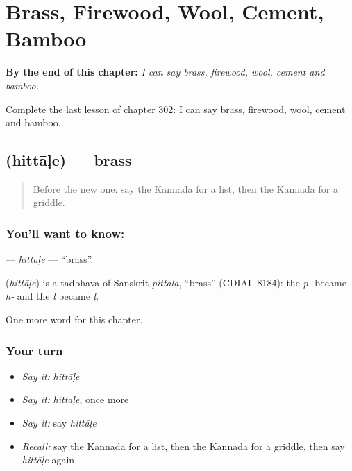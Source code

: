 
\chapter{Brass, Firewood, Wool, Cement, Bamboo}
\label{ch:ka-brass-firewood-wool-cement-bamboo}

\begin{chapteropening}
\textbf{By the end of this chapter:} \emph{I can say brass, firewood, wool, cement and bamboo.}

Complete the last lesson of chapter 302: I can say brass, firewood, wool, cement and bamboo.
\end{chapteropening}

\section[\texorpdfstring{\kn{ಹಿತ್ತಾಳೆ} (hittāḷe)}{ಹಿತ್ತಾಳೆ (hittāḷe)}]{ (hittāḷe) — brass}

\label{lesson:KA-C302-hittale}



\begin{quote}
Before the new one: say the Kannada for a list, then the Kannada for a griddle.
\end{quote}

\subsection*{You'll want to know: }
\textbf{} — \emph{hittāḷe} — \textquotedblleft{}brass\textquotedblright{}.

\begin{cousinweb}
\textbf{} (\emph{hittāḷe}) is a tadbhava of Sanskrit \emph{pittala}, \textquotedblleft{}brass\textquotedblright{} (CDIAL 8184): the \emph{p-} became \emph{h-} and the \emph{l} became \emph{ḷ}.
\end{cousinweb}

\begin{grammarlens}[title={What you've built}]
One more word for this chapter.
\end{grammarlens}

\subsection*{Your turn}
\begin{itemize}
\raggedright
  \item \emph{Say it:} \emph{hittāḷe}
  \item \emph{Say it:} \emph{hittāḷe}, once more
  \item \emph{Say it:} say \emph{hittāḷe}
  \item \emph{Recall:} say the Kannada for a list, then the Kannada for a griddle, then say \emph{hittāḷe} again
\end{itemize}

